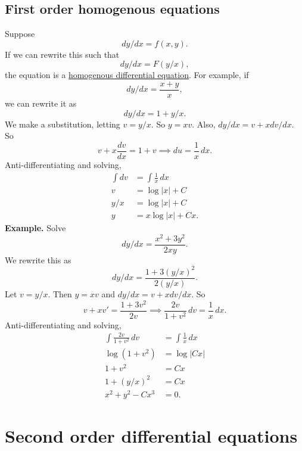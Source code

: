 \documentclass[11pt, oneside]{article}   	%
\begin{document}
\subsection{First order homogenous equations}
Suppose 
$$
dy/dx = f(x,y).
$$
If we can rewrite this such that
$$
dy/dx = F(y/x),
$$
the equation is a \underline{homogenous differential equation}. For example, if 
$$
dy/dx =  \frac{x+y}{x},
$$
we can rewrite it as
$$
dy/dx = 1 + y/x.
$$
We make a substitution, letting $v = y/x$. So $y = xv$. Also, $dy/dx = v + x dv/dx$. So
$$
v+x\frac{dv}{dx} = 1 + v\implies du = \frac{1}{x}\,dx.
$$
Anti-differentiating and solving,
\begin{align*}
\int dv 	&= \int \frac{1}{x}\,dx\\
	v	&= \log|x| + C\\
	y/x	&= \log|x| + C\\
	y 	&=x\log|x| + Cx.
\end{align*}
\textbf{Example.} Solve
$$
dy/dx  = \frac{x^2+3y^2}{2xy}.
$$
We rewrite this as
$$
dy/dx = \frac{1+3(y/x)^2}{2(y/x)}.
$$
Let $v= y/x$. Then $y=xv$ and $dy/dx = v + xdv/dx$. So 
$$
v+x v' = \frac{1+3v^2}{2v} \implies \frac{2v}{1+v^2}\,dv = \frac{1}{x}\,dx.
$$
Anti-differentiating and solving,
\begin{align*}
\int\frac{2v}{1+v^2}\,dv 	&= \int\frac{1}{x}\,dx\\
\log(1+v^2)			&= \log|Cx|\\
1+v^2 				&= Cx\\
1 + (y/x)^2 			&= Cx\\
x^2 + y^2	- Cx^3		&= 0.
\end{align*}
\section{Second order differential equations}
\end{document}
